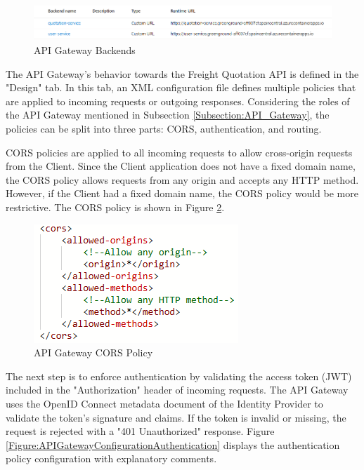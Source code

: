 \documentclass[12pt, reqno]{amsbook}
\theoremstyle{definition}
\theoremstyle{definition}
\numberwithin{section}{chapter}
\numberwithin{table}{chapter}
\numberwithin{figure}{chapter}
\begin{document}
\begin{figure}[H]
  \centering
  \includegraphics[width=0.9\linewidth]{images/APIGatewayBackends.png}
  \caption{\label{Figure:APIGatewayBackends}API Gateway Backends}
\end{figure}

The \ac{API} Gateway's behavior towards the Freight Quotation API is defined in the "Design" tab. In this tab, an \ac{XML} configuration file defines multiple policies that are applied to incoming requests or outgoing responses. Considering the roles of the \ac{API} Gateway mentioned in Subsection \ref{Subsection:API_Gateway}, the policies can be split into three parts: \Ac{CORS}, authentication, and routing.

\ac{CORS} policies are applied to all incoming requests to allow cross-origin requests from the Client. Since the Client application does not have a fixed domain name, the \ac{CORS} policy allows requests from any origin and accepts any \ac{HTTP} method. However, if the Client had a fixed domain name, the \ac{CORS} policy would be more restrictive. The \ac{CORS} policy is shown in Figure \ref{Figure:APIGatewayConfigurationCORS}.

\begin{figure}[H]
  \centering
  \includegraphics[width=0.4\linewidth]{images/APIGatewayConfigurationCORS.png}
  \caption{\label{Figure:APIGatewayConfigurationCORS}API Gateway \ac{CORS} Policy}
\end{figure}

The next step is to enforce authentication by validating the access token (\ac{JWT}) included in the "Authorization" header of incoming requests. The \ac{API} Gateway uses the OpenID Connect metadata document of the Identity Provider to validate the token's signature and claims. If the token is invalid or missing, the request is rejected with a "401 Unauthorized" response. Figure \ref{Figure:APIGatewayConfigurationAuthentication} displays the authentication policy configuration with explanatory comments.
\end{document}
